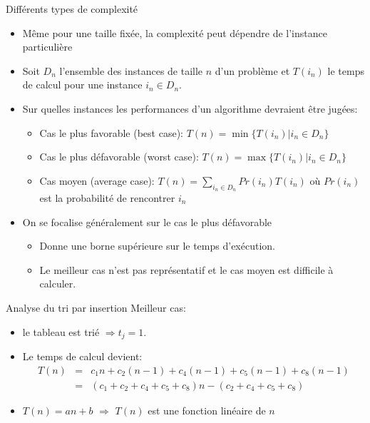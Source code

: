\begin{frame}{Différents types de complexité}
\begin{itemize}
\item Même pour une taille fixée, la complexité peut dépendre de l'instance particulière
\item Soit $D_n$ l'ensemble des instances de taille $n$ d'un problème et $T(i_n)$ le temps de calcul pour une instance $i_n\in D_n$.
\item Sur quelles instances les performances d'un algorithme devraient être jugées:
\begin{itemize}
\item Cas le plus favorable (best case): $T(n)=\min\{T(i_n)| i_n\in D_n\}$
\item Cas le plus défavorable (worst case): $T(n)=\max\{T(i_n)| i_n\in D_n\}$
\item Cas moyen (average case): $T(n)=\sum_{i_n\in D_n} Pr(i_n) T(i_n)$ où $Pr(i_n)$ est la probabilité de rencontrer $i_n$
\end{itemize}
\item On se focalise généralement sur le cas \alert{le plus défavorable}
\begin{itemize}
\item Donne une borne supérieure sur le temps d'exécution.
\item Le meilleur cas n'est pas représentatif et le cas moyen est difficile à calculer.
\end{itemize}
\end{itemize}
\end{frame}

\begin{frame}{Analyse du tri par insertion}
Meilleur cas:
\begin{itemize}
\item le tableau est trié $\Rightarrow t_j=1$.
\item Le temps de calcul devient:
\begin{eqnarray*}
T(n)&=&c_1 n+ c_2 (n-1)+c_4 (n-1)+c_5 (n-1)+c_8(n-1)\\
&=&(c_1+c_2+c_4+c_5+c_8)n- (c_2+c_4+c_5+c_8)
\end{eqnarray*}
\item $T(n)=an+b$ $\Rightarrow$ $T(n)$ est une fonction \alert{linéaire} de $n$\\

\end{itemize}

\end{frame}

